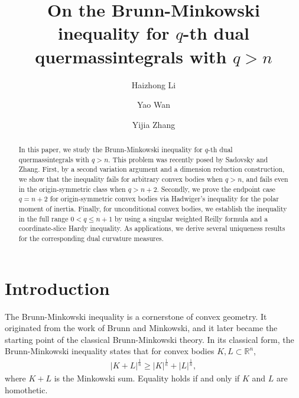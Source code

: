 \documentclass[12pt,leqno]{amsart}
\theoremstyle{plain} \newtheorem{thm}{Theorem}[section]
\theoremstyle{plain} \newtheorem{prop}[thm]{Proposition}
\theoremstyle{plain} \newtheorem{prob}[thm]{Problem}
\theoremstyle{definition} \newtheorem{defi}[thm]{Definition}
\theoremstyle{plain} \newtheorem{cor}[thm]{Corollary}
\theoremstyle{plain} \newtheorem{lem}[thm]{Lemma}
\theoremstyle{plain} \newtheorem{eg}{Example}[section]
\theoremstyle{remark} \newtheorem{rmk}[thm]{Remark}
\theoremstyle{plain} \newtheorem{conj}{Conjecture}
\numberwithin{equation}{section}
\newcommand{\bR}{\mathbb{R}}
\begin{document}
\title[Dual quermassintegrals beyond the volume index]{On the Brunn-Minkowski inequality for $q$-th dual quermassintegrals with $q>n$}

\author{Haizhong Li}
\address{Department of Mathematical Sciences, Tsinghua University, Beijing 100084, P.R. China}

\author{Yao Wan}
\address{Department of Mathematics, The Chinese University of Hong Kong, Shatin, N.T., Hong Kong}

\author{Yijia Zhang}
\address{Department of Mathematical Sciences, Tsinghua University, Beijing 100084, P.R. China}



\begin{abstract}
In this paper, we study the Brunn-Minkowski inequality for $q$-th dual quermassintegrals with $q>n$. This problem was recently posed by Sadovsky and Zhang. First, by a second variation argument and a dimension reduction construction, we show that the inequality fails for arbitrary convex bodies when $q>n$, and fails even in the origin-symmetric class when $q>n+2$. Secondly, we prove the endpoint case $q=n+2$ for origin-symmetric convex bodies via Hadwiger's inequality for the polar moment of inertia. Finally, for unconditional convex bodies, we establish the inequality in the full range $0<q\le n+1$ by using a singular weighted Reilly formula and a coordinate-slice Hardy inequality. As applications, we derive several uniqueness results for the corresponding dual curvature measures.
\end{abstract}

\maketitle

\section{Introduction}\label{sec-1}

The Brunn-Minkowski inequality is a cornerstone of convex geometry. 
It originated from the work of Brunn and Minkowski, and it later became the starting point of the classical Brunn-Minkowski theory. In its classical form, the Brunn-Minkowski 
inequality states that for convex bodies $K,L\subset \bR^n$,
\begin{align}\label{classical-BM}
    |K+L|^{\frac1n}\geq |K|^{\frac1n}+|L|^{\frac1n},
\end{align}
where $K+L$ is the Minkowski sum. Equality holds if and only if $K$ and $L$ are homothetic. 
\end{document}
